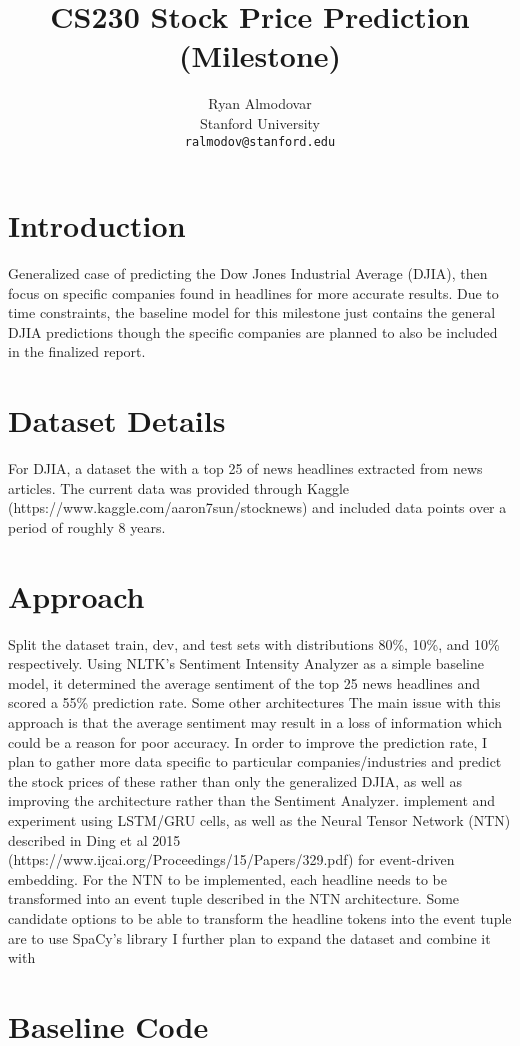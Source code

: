 \documentclass{article} %
\title{CS230 Stock Price Prediction (Milestone)}
\author{
Ryan Almodovar \\
Stanford University\\
\texttt{ralmodov@stanford.edu} \\
}
\begin{document}
\maketitle


\section{Introduction}
Generalized case of predicting the Dow Jones Industrial Average (DJIA), then focus on specific companies found in headlines
for more accurate results.
Due to time constraints, the baseline model for this milestone just contains the general DJIA predictions though the
specific companies are planned to also be included in the finalized report.

\section{Dataset Details}
For DJIA, a dataset the with a top 25 of news headlines extracted from news articles.
The current data was provided through Kaggle (https://www.kaggle.com/aaron7sun/stocknews) and included data points over a period of roughly 8 years.

\section{Approach}
Split the dataset train, dev, and test sets with distributions 80\%, 10\%, and 10\% respectively.
Using NLTK's Sentiment Intensity Analyzer as a simple baseline model, it determined the average sentiment of the top 25 news headlines and scored a 55\% prediction rate. 
Some other architectures 
The main issue with this approach is that the average sentiment may result in a loss of information which could be a reason for poor accuracy.
In order to improve the prediction rate, I plan to gather more data specific to particular companies/industries and predict the stock prices of these rather than only the generalized DJIA, as well as improving the architecture rather than the Sentiment Analyzer.
implement and experiment using LSTM/GRU cells, as well as the Neural Tensor Network (NTN) described in Ding et al 2015 (https://www.ijcai.org/Proceedings/15/Papers/329.pdf) for event-driven embedding.
For the NTN to be implemented, each headline needs to be transformed into an event tuple described in the NTN architecture.
Some candidate options to be able to transform the headline tokens into the event tuple are to use SpaCy's library
I further plan to expand the dataset and combine it with 

\section{Baseline Code}
\end{document}
